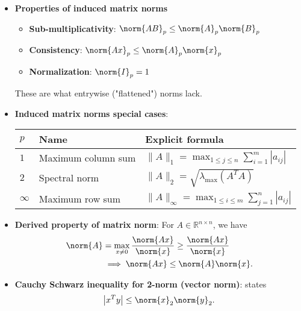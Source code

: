 \documentclass{report}
\begin{document}
\begin{itemize}
        \item \textbf{Properties of induced matrix norms}
            \begin{itemize}
                \item \textbf{Sub-multiplicativity}: $\norm{AB}_{p} \leq \norm{A}_{p}\norm{B}_{p} $
                \item \textbf{Consistency}: $\norm{Ax}_{p} \leq \norm{A}_{p}\norm{x}_{p} $
                \item \textbf{Normalization}: $\norm{I}_{p} = 1 $
            \end{itemize}
            These are what entrywise ("flattened") norms lack.
        \item \textbf{Induced matrix norms special cases}:
            \begin{center}
                \begin{tabular}{p{1cm}|p{5cm}|p{5cm}}
                    \toprule
                    $p$ & \textbf{Name} & \textbf{Explicit formula} \\
                    \midrule
                    $1$ & Maximum column sum &
                    $\displaystyle \|A\|_{1} = \max_{1 \leq j \leq n} \sum_{i=1}^{m} |a_{ij}|$ \\[3ex]
                    $2$ & Spectral norm &
                    $\displaystyle \|A\|_{2} = \sqrt{\lambda_{\max}(A^{T}A)}$ \\[3ex]
                    $\infty$ & Maximum row sum &
                    $\displaystyle \|A\|_{\infty} = \max_{1 \leq i \leq m} \sum_{j=1}^{n} |a_{ij}|$ \\
                    \bottomrule
                \end{tabular}
            \end{center}
        \item \textbf{Derived property of matrix norm}: For $A \in \mathbb{R}^{n\times n}$, we have
            \begin{align*}
                \norm{A} &= \max_{x\ne 0} \frac{\norm{Ax}}{\norm{x}} \geq \frac{\norm{Ax}}{\norm{x}} \\
                         &\implies \norm{Ax} \leq \norm{A}\norm{x}
            .\end{align*}
        \item \textbf{Cauchy Schwarz inequality for 2-norm (vector norm)}: states
            \begin{align*}
                \left\lvert x^{T}y \right\rvert \leq \norm{x}_{2}\norm{y}_{2} 
            .\end{align*}

\end{itemize}
\end{document}

